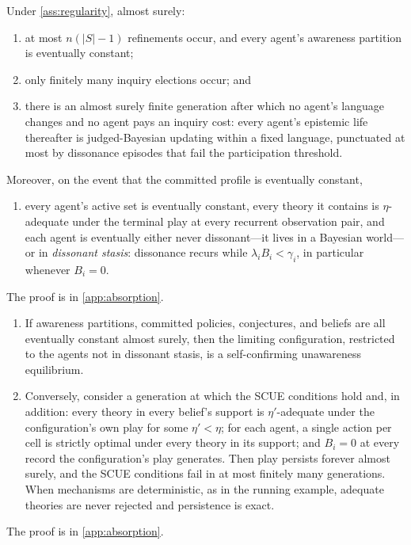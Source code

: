 \begin{theorem}
\label{thm:absorption}
Under \cref{ass:regularity}, almost surely:
\begin{enumerate}[label=(\alph*)]
  \item at most $n(|S|-1)$ refinements occur, and every agent's awareness
  partition is eventually constant;
  \item only finitely many inquiry elections occur; and
  \item there is an almost surely finite generation after which no agent's
  language changes and no agent pays an inquiry cost: every agent's
  epistemic life thereafter is judged-Bayesian updating within a fixed
  language, punctuated at most by dissonance episodes that fail the
  participation threshold.
\end{enumerate}
Moreover, on the event that the committed profile is eventually constant,
\begin{enumerate}[label=(\alph*),start=4]
  \item every agent's active set is eventually constant, every theory it
  contains is $\eta$-adequate under the terminal play at every recurrent
  observation pair, and each agent is eventually either never
  dissonant---it lives in a Bayesian world---or in \emph{dissonant stasis}:
  dissonance recurs while $\lambda_iB_i<\gamma_i$, in particular whenever
  $B_i=0$.
\end{enumerate}
The proof is in \cref{app:absorption}.
\end{theorem}

\begin{proposition}
\label{prop:rest-points}
\leavevmode
\begin{enumerate}[label=(\roman*)]
  \item If awareness partitions, committed policies, conjectures, and
  beliefs are all eventually constant almost surely, then the limiting
  configuration, restricted to the agents not in dissonant stasis, is a
  self-confirming unawareness equilibrium.
  \item Conversely, consider a generation at which the SCUE conditions hold
  and, in addition: every theory in every belief's support is
  $\eta'$-adequate under the configuration's own play for some $\eta'<\eta$;
  for each agent, a single action per cell is strictly optimal under every
  theory in its support; and $B_i=0$ at every record the configuration's
  play generates.  Then play persists forever almost surely, and the SCUE
  conditions fail in at most finitely many generations.  When mechanisms
  are deterministic, as in the running example, adequate theories are never
  rejected and persistence is exact.
\end{enumerate}
The proof is in \cref{app:absorption}.
\end{proposition}

